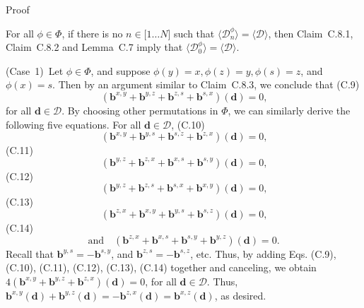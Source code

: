 \documentclass[
]{article}
\begin{document}
Proof

For all \(\phi \in \Phi\), if there is no
\(n \in \lbrack 1\ldots N\rbrack\) such that
\({\langle\mathcal{D}_{n}^{\phi}\rangle} = {\langle\mathcal{D}\rangle}\),
then Claim~C.8.1, Claim~C.8.2 and Lemma~C.7 imply that
\({\langle\mathcal{D}_{0}^{\phi}\rangle} = {\langle\mathcal{D}\rangle}\).

(Case~1)~Let \(\phi \in \Phi\), and suppose
\(\phi(y) = x,\phi(z) = y,\phi(s) = z\), and \(\phi(x) = s\). Then by an
argument similar to Claim~C.8.3, we conclude that
(C.9)\[\left( \mathbf{b}^{x,y} + \mathbf{b}^{y,z} + \mathbf{b}^{z,s} + \mathbf{b}^{s,x} \right)\left( \mathbf{d} \right) = 0\text{,}\]
for all \(\mathbf{d} \in \mathcal{D}\). By choosing other permutations
in \(\Phi\), we can similarly derive the following five equations. For
all \(\mathbf{d} \in \mathcal{D}\),
(C.10)\[\left( \mathbf{b}^{x,y} + \mathbf{b}^{y,s} + \mathbf{b}^{s,z} + \mathbf{b}^{z,x} \right)\left( \mathbf{d} \right) = 0\text{,}\](C.11)\[\left( \mathbf{b}^{y,z} + \mathbf{b}^{z,x} + \mathbf{b}^{x,s} + \mathbf{b}^{s,y} \right)\left( \mathbf{d} \right) = 0\text{,}\](C.12)\[\left( \mathbf{b}^{y,z} + \mathbf{b}^{z,s} + \mathbf{b}^{s,x} + \mathbf{b}^{x,y} \right)\left( \mathbf{d} \right) = 0\text{,}\](C.13)\[\left( \mathbf{b}^{z,x} + \mathbf{b}^{x,y} + \mathbf{b}^{y,s} + \mathbf{b}^{s,z} \right)\left( \mathbf{d} \right) = 0\text{,}\](C.14)\[\text{and}\quad\left( \mathbf{b}^{z,x} + \mathbf{b}^{x,s} + \mathbf{b}^{s,y} + \mathbf{b}^{y,z} \right)\left( \mathbf{d} \right) = 0\text{.}\]
Recall that \(\mathbf{b}^{y,s} = - \mathbf{b}^{s,y}\), and
\(\mathbf{b}^{z,s} = - \mathbf{b}^{s,z}\), etc. Thus, by adding Eqs.
(C.9), (C.10), (C.11), (C.12), (C.13), (C.14) together and canceling, we
obtain
\(4\left( \mathbf{b}^{x,y} + \mathbf{b}^{y,z} + \mathbf{b}^{z,x} \right)\left( \mathbf{d} \right) = 0\),
for all \(\mathbf{d} \in \mathcal{D}\). Thus,
\(\mathbf{b}^{x,y}\left( \mathbf{d} \right) + \mathbf{b}^{y,z}\left( \mathbf{d} \right) = - \mathbf{b}^{z,x}\left( \mathbf{d} \right) = \mathbf{b}^{x,z}\left( \mathbf{d} \right)\),
as desired.
\end{document}
